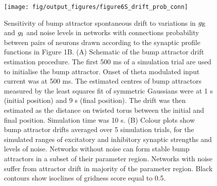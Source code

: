 \documentclass[a4paper,12pt]{article}
\newcommand{\ssc}[3]{\ensuremath{#1_{\text{#2}_{\text{#3}}}}}
\newcommand{\gE      }{\ssc{g}      {\scriptsize{E}}{}}
\newcommand{\gI      }{\ssc{g}      {\scriptsize{I}}{}}
\begin{document}
\clearpage

\begin{figure}[ht!]
    \internallinenumbers
    \centering
        \texttt{[image: fig/output\_figures/figure6S\_drift\_prob\_conn]}
    \caption{Sensitivity of bump attractor spontaneous drift to variations in
    $\gE$ and $\gI$ and noise levels in networks with connections probability
    between pairs of neurons drawn according to the synaptic profile functions
    in Figure 1B. (A) Schematic of the bump attractor drift estimation
    procedure. The first 500 ms of a simulation trial are used to initialise
    the bump attractor. Onset of theta modulated input current was at 500 ms.
    The estimated centres of bump attractors measured by the least squares fit
    of symmetric Gaussians were at 1 s (initial position) and 9 s (final
    position). The drift was then estimated as the distance on twisted torus
    between the initial and final position. Simulation time was 10 s. (B)
    Colour plots show bump attractor drifts averaged over 5 simulation trials,
    for the simulated ranges of excitatory and inhibitory synaptic strengths
    and levels of noise.  Networks without noise can form stable bump
    attractors in a subset of their parameter region. Networks with noise
    suffer from attractor drift in majority of the parameter region. Black
    contours show isoclines of gridness score equal to 0.5.}
\end{figure}

\clearpage

%
\end{document}
